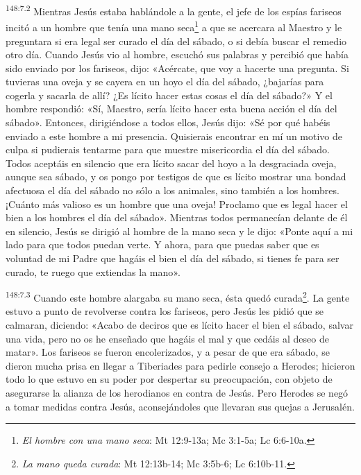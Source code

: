 \par
\textsuperscript{148:7.2} Mientras Jesús estaba hablándole a la gente, el jefe de los espías fariseos incitó a un hombre que tenía una mano seca\footnote{\textit{El hombre con una mano seca}: Mt 12:9-13a; Mc 3:1-5a; Lc 6:6-10a.} a que se acercara al Maestro y le preguntara si era legal ser curado el día del sábado, o si debía buscar el remedio otro día. Cuando Jesús vio al hombre, escuchó sus palabras y percibió que había sido enviado por los fariseos, dijo: «Acércate, que voy a hacerte una pregunta. Si tuvieras una oveja y se cayera en un hoyo el día del sábado, ¿bajarías para cogerla y sacarla de allí? ¿Es lícito hacer estas cosas el día del sábado?» Y el hombre respondió: «Sí, Maestro, sería lícito hacer esta buena acción el día del sábado». Entonces, dirigiéndose a todos ellos, Jesús dijo: «Sé por qué habéis enviado a este hombre a mi presencia. Quisierais encontrar en mí un motivo de culpa si pudierais tentarme para que muestre misericordia el día del sábado. Todos aceptáis en silencio que era lícito sacar del hoyo a la desgraciada oveja, aunque sea sábado, y os pongo por testigos de que es lícito mostrar una bondad afectuosa el día del sábado no sólo a los animales, sino también a los hombres. ¡Cuánto más valioso es un hombre que una oveja! Proclamo que es legal hacer el bien a los hombres el día del sábado». Mientras todos permanecían delante de él en silencio, Jesús se dirigió al hombre de la mano seca y le dijo: «Ponte aquí a mi lado para que todos puedan verte. Y ahora, para que puedas saber que es voluntad de mi Padre que hagáis el bien el día del sábado, si tienes fe para ser curado, te ruego que extiendas la mano».

\par
\textsuperscript{148:7.3} Cuando este hombre alargaba su mano seca, ésta quedó curada\footnote{\textit{La mano queda curada}: Mt 12:13b-14; Mc 3:5b-6; Lc 6:10b-11.}. La gente estuvo a punto de revolverse contra los fariseos, pero Jesús les pidió que se calmaran, diciendo: «Acabo de deciros que es lícito hacer el bien el sábado, salvar una vida, pero no os he enseñado que hagáis el mal y que cedáis al deseo de matar». Los fariseos se fueron encolerizados, y a pesar de que era sábado, se dieron mucha prisa en llegar a Tiberiades para pedirle consejo a Herodes; hicieron todo lo que estuvo en su poder por despertar su preocupación, con objeto de asegurarse la alianza de los herodianos en contra de Jesús. Pero Herodes se negó a tomar medidas contra Jesús, aconsejándoles que llevaran sus quejas a Jerusalén.

